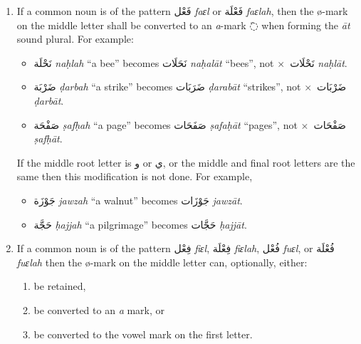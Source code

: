 \documentclass[
  10pt,
]{book}
\providecommand{\tightlist}{%
  \setlength{\itemsep}{0pt}\setlength{\parskip}{0pt}}
\begin{document}
\begin{enumerate}
\def\labelenumi{\arabic{enumi}.}
\item
  If a common noun is of the pattern \foreignlanguage{arabic}{فَعْل} \emph{faɛl} or \foreignlanguage{arabic}{فَعْلَة} \emph{faɛlah}, then the ø-mark on the middle letter shall be converted to an \emph{a}-mark \foreignlanguage{arabic}{◌َ} when forming the \emph{āt} sound plural. For example:

  \begin{itemize}
  \tightlist
  \item
    \foreignlanguage{arabic}{نَحْلَة} \emph{naḥlah} \enquote{a bee} becomes \foreignlanguage{arabic}{نَحَلَات} \emph{naḥalāt} \enquote{bees}, not \(\times\)~\foreignlanguage{arabic}{نَحْلَات} \emph{naḥlāt}.
  \item
    \foreignlanguage{arabic}{ضَرْبَة} \emph{ḍarbah} \enquote{a strike} becomes \foreignlanguage{arabic}{ضَرَبَات} \emph{ḍarabāt} \enquote{strikes}, not \(\times\)~\foreignlanguage{arabic}{ضَرْبَات} \emph{ḍarbāt}.
  \item
    \foreignlanguage{arabic}{صَفْحَة} \emph{ṣafḥah} \enquote{a page} becomes \foreignlanguage{arabic}{صَفَحَات} \emph{ṣafaḥāt} \enquote{pages}, not \(\times\)~\foreignlanguage{arabic}{صَفْحَات} \emph{ṣafḥāt}.
  \end{itemize}

  If the middle root letter is \foreignlanguage{arabic}{و} or \foreignlanguage{arabic}{ي}, or the middle and final root letters are the same then this modification is not done. For example,

  \begin{itemize}
  \tightlist
  \item
    \foreignlanguage{arabic}{جَوْزَة} \emph{jawzah} \enquote{a walnut} becomes \foreignlanguage{arabic}{جَوْزَات} \emph{jawzāt}.
  \item
    \foreignlanguage{arabic}{حَجَّة} \emph{ḥajjah} \enquote{a pilgrimage} becomes \foreignlanguage{arabic}{حَجَّات} \emph{ḥajjāt}.
  \end{itemize}
\item
  If a common noun is of the pattern \foreignlanguage{arabic}{فِعْل} \emph{fiɛl}, \foreignlanguage{arabic}{فِعْلَة} \emph{fiɛlah}, \foreignlanguage{arabic}{فُعْل} \emph{fuɛl}, or \foreignlanguage{arabic}{فُعْلَة} \emph{fuɛlah} then the ø-mark on the middle letter can, optionally, either:

  \begin{enumerate}
  \def\labelenumii{\roman{enumii}.}
  \tightlist
  \item
    be retained,
  \item
    be converted to an \emph{a} mark, or
  \item
    be converted to the vowel mark on the first letter.
  \end{enumerate}


\end{enumerate}
\end{document}
